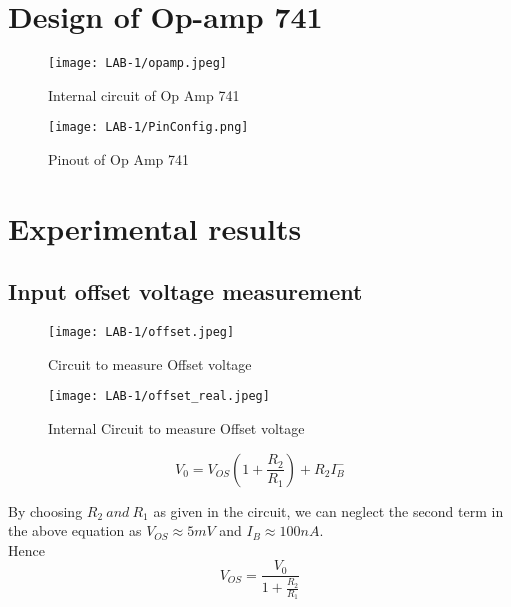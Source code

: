 \documentclass[12pt]{article}
\begin{document}
    \section{Design of Op-amp 741}
    
        \begin{figure}[H]
            \centering
            \texttt{[image: LAB-1/opamp.jpeg]}
            \caption{Internal circuit of Op Amp 741}
        \end{figure}
        
        \begin{figure}[H]
            \centering
            \texttt{[image: LAB-1/PinConfig.png]}
            \caption{Pinout of Op Amp 741}
        \end{figure}
        
        \newpage       
    \section{Experimental results}
    
      \subsection{Input offset voltage measurement} 
        \begin{figure}[H]
            \centering
            \texttt{[image: LAB-1/offset.jpeg]}
            \caption{Circuit to measure Offset voltage}
        \end{figure}
        
        \begin{figure}[H]
            \centering
            \texttt{[image: LAB-1/offset\_real.jpeg]}
            \caption{Internal Circuit to measure Offset voltage}
        \end{figure}
        
        \begin{equation}
            V_0 = V_{OS}\left(1 + \frac{R_2}{R_1}\right) + R_2I^-_B 
        \end{equation}
      
        By choosing $R_2 \ and \ R_1$ as given in the circuit, we can neglect the second term in the above equation as $V_{OS} \approx 5mV$ and $I_B \approx 100nA$. \\
        Hence
        \begin{equation}
            V_{OS} = \frac{V_0}{1 + \frac{R_2}{R_1}}  
        \end{equation}
        
\end{document}
